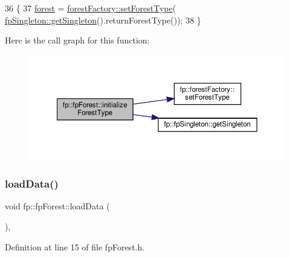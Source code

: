 \begin{DoxyCode}
36                                               \{
37                 \hyperlink{classfp_1_1fpForest_a4ce6af867d36c8d62c860db8982235c4}{forest} = \hyperlink{classfp_1_1forestFactory_a856050d77f96dd155d41b95684552c20}{forestFactory::setForestType}(
      \hyperlink{classfp_1_1fpSingleton_a8bdae77b68521003e3fc630edec2e240}{fpSingleton::getSingleton}().returnForestType());
38             \}
\end{DoxyCode}
Here is the call graph for this function\+:\nopagebreak
\begin{figure}[H]
\begin{center}
\leavevmode
\includegraphics[width=350pt]{classfp_1_1fpForest_a776ae408ea6c9af459e6ebba7e363d57_cgraph}
\end{center}
\end{figure}
\mbox{\label{classfp_1_1fpForest_a01631065f4909f10cea4b690084a345a}} 
\subsubsection{\texorpdfstring{load\+Data()}{loadData()}}
{\footnotesize\ttfamily void fp\+::fp\+Forest\+::load\+Data (\begin{DoxyParamCaption}{ }\end{DoxyParamCaption})\hspace{0.3cm}{\ttfamily [inline]}, {\ttfamily [protected]}}



Definition at line 15 of file fp\+Forest.\+h.


